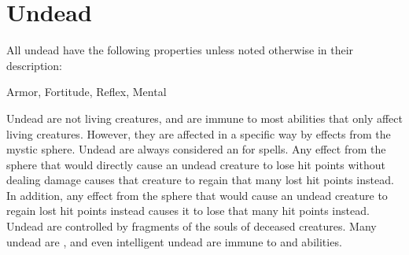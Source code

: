   
        \section{Undead}

        All undead have the following properties unless noted otherwise in their description:
        
    
     Armor,
     Fortitude,
     Reflex,
     Mental
  
     Undead are not living creatures, and are immune to most abilities that only affect living creatures.
    However, they are affected in a specific way by effects from the  mystic sphere.
    Undead are always considered an  for  spells.
    Any effect from the  sphere that would directly cause an undead creature to lose hit points without dealing damage causes that creature to regain that many lost hit points instead.
    In addition, any effect from the  sphere that would cause an undead creature to regain lost hit points instead causes it to lose that many hit points instead.
     Undead are controlled by fragments of the souls of deceased creatures.
    Many undead are , and even intelligent undead are immune to  and  abilities.
  
